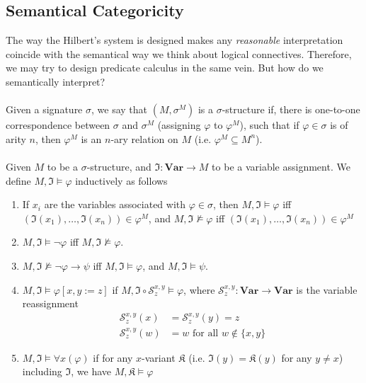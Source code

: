 \documentclass{treatise}
\begin{document}
\begin{shaded}
\subsection{Semantical Categoricity}
The way the Hilbert's system is designed makes any \textit{reasonable} interpretation coincide with the semantical way we think about logical connectives. Therefore, we may try to design predicate calculus in the same vein. But how do we semantically interpret?
\\
\\
Given a signature $\sigma$, we say that $(M, \sigma^M)$ is a $\sigma$-structure if, there is one-to-one correspondence between $\sigma$ and $\sigma^M$ (assigning $\varphi$ to $\varphi^M$), such that if $\varphi \in \sigma$ is of arity $n$, then $\varphi^M$ is an $n$-ary relation on $M$ (i.e. $\varphi^M \subseteq M^n$).
\\
\\
Given $M$ to be a $\sigma$-structure, and $\mathfrak{I}: \mathbf{Var} \to M$ to be a variable assignment. We define $M, \mathfrak{I} \vDash \varphi$ inductively as follows
\begin{enumerate}
    \item If $x_i$ are the variables associated with $\varphi \in \sigma$, then $M, \mathfrak{I} \vDash \varphi$ iff $(\mathfrak{I}(x_1), \hdots, \mathfrak{I}(x_n)) \in \varphi^M$, and $M, \mathfrak{I} \not\vDash \varphi$ iff $(\mathfrak{I}(x_1), \hdots, \mathfrak{I}(x_n)) \in \varphi^M$
    \item $M, \mathfrak{I} \vDash \neg \varphi$ iff $M, \mathfrak{I} \not\vDash \varphi$.
    \item $M, \mathfrak{I} \not\vDash \neg \varphi \to \psi$ iff $M, \mathfrak{I} \vDash \varphi$, and $M, \mathfrak{I} \vDash \psi$.
    \item $M, \mathfrak{I} \vDash \varphi[x, y := z]$ if $M, \mathfrak{I} \circ \mathcal{S}^{x, y}_z \vDash \varphi$, where $\mathcal{S}^{x, y}_z : \mathbf{Var} \to \mathbf{Var}$ is the variable reassignment
    \begin{align*}
        \mathcal{S}^{x, y}_z (x) & = \mathcal{S}^{x, y}_z (y) = z
        \\
        \mathcal{S}^{x, y}_z (w) & = w \mbox{ for all } w \notin \{ x, y \}
    \end{align*}
    \item $M, \mathfrak{I} \vDash \forall x (\varphi)$ if for any $x$-variant $\mathfrak{K}$ (i.e. $\mathfrak{I}(y) = \mathfrak{K}(y)$ for any $y \neq x$) including $\mathfrak{I}$, we have $M, \mathfrak{K} \vDash \varphi$

\end{enumerate}
\end{shaded}
\end{document}
